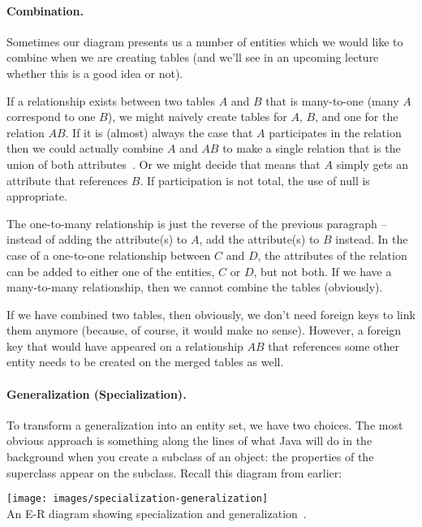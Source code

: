 \documentclass[a4paper]{report}
\begin{document}
\paragraph{Combination.}
Sometimes our diagram presents us a number of entities which we would like to combine when we are creating tables (and we'll see in an upcoming lecture whether this is a good idea or not). 

If a relationship exists between two tables $A$ and $B$ that is many-to-one (many $A$ correspond to one $B$), we might naively create tables for $A$, $B$, and one for the relation $AB$. If it is (almost) always the case that $A$ participates in the relation then we could actually combine $A$ and $AB$ to make a single relation that is the union of both attributes~\cite{dsc}. Or we might decide that means that $A$ simply gets an attribute that references $B$. If participation is not total, the use of null is appropriate.

The one-to-many relationship is just the reverse of the previous paragraph -- instead of adding the attribute(s) to $A$, add the attribute(s) to $B$ instead. In the case of a one-to-one relationship between $C$ and $D$, the attributes of the relation can be added to either one of the entities, $C$ or $D$, but not both. If we have a many-to-many relationship, then we cannot combine the tables (obviously). 

If we have combined two tables, then obviously, we don't need foreign keys to link them anymore (because, of course, it would make no sense). However, a foreign key that would have appeared on a relationship $AB$ that references some other entity needs to be created on the merged tables as well.

\paragraph{Generalization (Specialization).} To transform a generalization into an entity set, we have two choices. The most obvious approach is something along the lines of what Java will do in the background when you create a subclass of an object: the properties of the superclass appear on the subclass. Recall this diagram from earlier:

\begin{center}
\texttt{[image: images/specialization-generalization]}\\
An E-R diagram showing specialization and generalization~\cite{dsc}.
\end{center}
\end{document}
